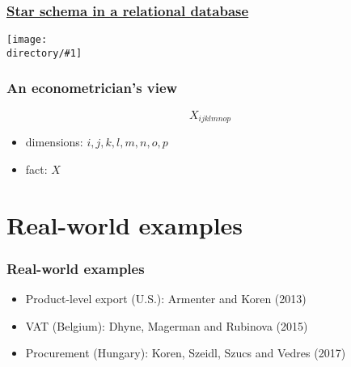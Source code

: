 \documentclass[compress,mathserif]{beamer}
\newcommand{\directory}{./exhibits}
\newcommand{\longfigure}[2]{\begin{frame}\frametitle{\hyperlink{#1back}{#2}}\hypertarget{#1}{{\begin{center}\texttt{[image: \\directory/\#1]}\end{center}}}\end{frame}}
\begin{document}
\longfigure{star-schema}{Star schema in a relational database}


\begin{frame}\frametitle{An econometrician's view}\hypertarget{An econometrician's view}{}
\[
X_{ijklmnop}
\]
\begin{itemize}
\item dimensions: $i,j,k,l,m,n,o,p$

\item fact: $X$




\end{itemize}
\end{frame}







\section{Real-world examples}\hypertarget{Real-world examples}{}
\begin{frame}\frametitle{Real-world examples}\hypertarget{Real-world examples}{}
\begin{itemize}
\item Product-level export (U.S.): Armenter and Koren (2013)

\item VAT (Belgium): Dhyne, Magerman and Rubinova (2015)

\item Procurement (Hungary): Koren, Szeidl, Szucs and Vedres (2017)




\end{itemize}
\end{frame}
\end{document}
